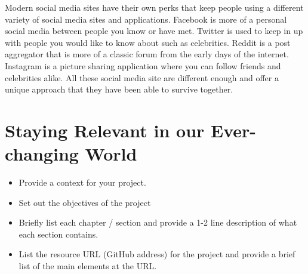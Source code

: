 Modern social media sites have their own perks that keep people using a different variety of social media sites and applications. Facebook is more of a personal social media between people you know or have met. Twitter is used to keep in up with people you would like to know about such as celebrities. Reddit is a post aggregator that is more of a classic forum from the early days of the internet. Instagram is a picture sharing application where you can follow friends and celebrities alike. All these social media site are different enough and offer a unique approach that they have been able to survive together. 

\section{Staying Relevant in our Ever-changing World} 


\begin{itemize}
\item Provide a context for your project.
\item Set out the objectives of the project
\item Briefly list each chapter / section and provide a 1-2 line description of what each section contains.
\item List the resource URL (GitHub address) for the project and provide a brief list of the main elements at the URL.
\end{itemize}
